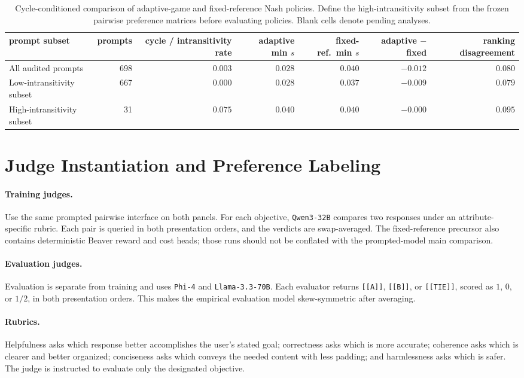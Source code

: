 \documentclass{article}
\theoremstyle{remark}
\theoremstyle{plain}
\begin{document}
\begin{table}[t]
\centering\scriptsize
\setlength{\tabcolsep}{2.8pt}
\caption{Cycle-conditioned comparison of adaptive-game and fixed-reference Nash policies. Define the high-intransitivity subset from the frozen pairwise preference matrices before evaluating policies. Blank cells denote pending analyses.}
\label{tab:cycle-conditioned}
\begin{tabular}{lrrrrrr}
\toprule
prompt subset & prompts & cycle / intransitivity rate & adaptive min $s$ & fixed-ref.\ min $s$ & adaptive $-$ fixed & ranking disagreement\\
\midrule
All audited prompts & 698 & $0.003$ & $0.028$ & $0.040$ & $-0.012$ & $0.080$ \\
Low-intransitivity subset & 667 & $0.000$ & $0.028$ & $0.037$ & $-0.009$ & $0.079$ \\
High-intransitivity subset & 31 & $0.075$ & $0.040$ & $0.040$ & $-0.000$ & $0.095$ \\
\bottomrule
\end{tabular}
\end{table}

\section{Judge Instantiation and Preference Labeling}
\label{app:labeling}
\paragraph{Training judges.}
Use the same prompted pairwise interface on both panels. For each objective, \texttt{Qwen3-32B} compares two responses under an attribute-specific rubric. Each pair is queried in both presentation orders, and the verdicts are swap-averaged. The fixed-reference precursor also contains deterministic Beaver reward and cost heads; those runs should not be conflated with the prompted-model main comparison.

\paragraph{Evaluation judges.}
Evaluation is separate from training and uses \texttt{Phi-4} and \texttt{Llama-3.3-70B}. Each evaluator returns \texttt{[[A]]}, \texttt{[[B]]}, or \texttt{[[TIE]]}, scored as $1$, $0$, or $1/2$, in both presentation orders. This makes the empirical evaluation model skew-symmetric after averaging.

\paragraph{Rubrics.}
Helpfulness asks which response better accomplishes the user's stated goal; correctness asks which is more accurate; coherence asks which is clearer and better organized; conciseness asks which conveys the needed content with less padding; and harmlessness asks which is safer. The judge is instructed to evaluate only the designated objective.
\end{document}
